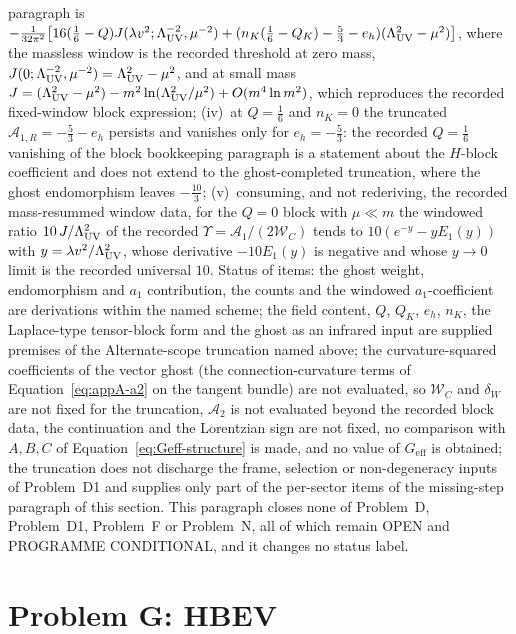 paragraph is \(-\frac{1}{32\pi^2}\bigl[16(\tfrac16-Q)J(\lambda v^2;\Lambda_{\mathrm{UV}}^{-2},\mu^{-2})+(n_K(\tfrac16-Q_K)-\tfrac53-e_h)(\Lambda_{\mathrm{UV}}^2-\mu^2)\bigr]\), where the massless window is the recorded threshold at zero mass, \(J(0;\Lambda_{\mathrm{UV}}^{-2},\mu^{-2})=\Lambda_{\mathrm{UV}}^2-\mu^2\), and at small mass \(J=(\Lambda_{\mathrm{UV}}^2-\mu^2)-m^2\ln(\Lambda_{\mathrm{UV}}^2/\mu^2)+O(m^4\ln m^2)\), which reproduces the recorded fixed-window block expression; (iv)~at \(Q=\tfrac16\) and \(n_K=0\) the truncated \(\mathcal A_{1,R}=-\tfrac53-e_h\) persists and vanishes only for \(e_h=-\tfrac53\): the recorded \(Q=\tfrac16\) vanishing of the block bookkeeping paragraph is a statement about the \(H\)-block coefficient and does not extend to the ghost-completed truncation, where the ghost endomorphism leaves \(-\tfrac{10}{3}\); (v)~consuming, and not rederiving, the recorded mass-resummed window data, for the \(Q=0\) block with \(\mu\ll m\) the windowed ratio \(10\,J/\Lambda_{\mathrm{UV}}^2\) of the recorded \(\Upsilon=\mathcal A_1/(2\mathcal W_C)\) tends to \(10(e^{-y}-yE_1(y))\) with \(y=\lambda v^2/\Lambda_{\mathrm{UV}}^2\), whose derivative \(-10E_1(y)\) is negative and whose \(y\to0\) limit is the recorded universal \(10\). Status of items: the ghost weight, endomorphism and \(a_1\) contribution, the counts and the windowed \(a_1\)-coefficient are derivations within the named scheme; the field content, \(Q\), \(Q_K\), \(e_h\), \(n_K\), the Laplace-type tensor-block form and the ghost as an infrared input are supplied premises of the Alternate-scope truncation named above; the curvature-squared coefficients of the vector ghost (the connection-curvature terms of Equation~\eqref{eq:appA-a2} on the tangent bundle) are not evaluated, so \(\mathcal W_C\) and \(\delta_W\) are not fixed for the truncation, \(\mathcal A_2\) is not evaluated beyond the recorded block data, the continuation and the Lorentzian sign are not fixed, no comparison with \(A,B,C\) of Equation~\eqref{eq:Geff-structure} is made, and no value of \(G_{\mathrm{eff}}\) is obtained; the truncation does not discharge the frame, selection or non-degeneracy inputs of Problem~D1 and supplies only part of the per-sector items of the missing-step paragraph of this section. This paragraph closes none of Problem~D, Problem~D1, Problem~F or Problem~N, all of which remain OPEN and PROGRAMME CONDITIONAL, and it changes no status label.

\section{Problem G: HBEV}
\label{sec:status-G}

